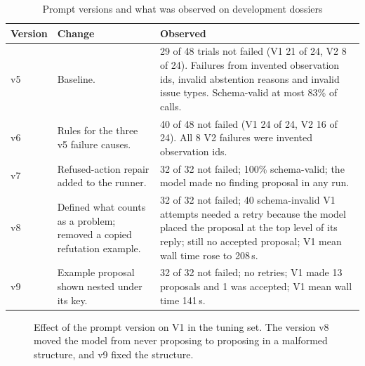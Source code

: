 \begin{table}[H]
\centering
\caption{Prompt versions and what was observed on development dossiers}
\label{tab:promptdev}
\small
\begin{tabularx}{\linewidth}{@{}l p{3.4cm} X@{}}
\toprule
\textbf{Version} & \textbf{Change} & \textbf{Observed} \\ \midrule
v5 & Baseline. & 29 of 48 trials not failed (V1 21 of 24, V2 8 of 24). Failures from invented observation ids, invalid abstention reasons and invalid issue types. Schema-valid at most 83\% of calls. \\
v6 & Rules for the three v5 failure causes. & 40 of 48 not failed (V1 24 of 24, V2 16 of 24). All 8 V2 failures were invented observation ids. \\
v7 & Refused-action repair added to the runner. & 32 of 32 not failed; 100\% schema-valid; the model made no finding proposal in any run. \\
v8 & Defined what counts as a problem; removed a copied refutation example. & 32 of 32 not failed; 40 schema-invalid V1 attempts needed a retry because the model placed the proposal at the top level of its reply; still no accepted proposal; V1 mean wall time rose to 208\,s. \\
v9 & Example proposal shown nested under its key. & 32 of 32 not failed; no retries; V1 made 13 proposals and 1 was accepted; V1 mean wall time 141\,s. \\
\bottomrule
\end{tabularx}
\end{table}

\begin{figure}[H]
\centering
{}
\caption{Effect of the prompt version on V1 in the tuning set. The version v8 moved the model from never
proposing to proposing in a malformed structure, and v9 fixed the structure.}
\label{fig:promptdev}
\end{figure}

